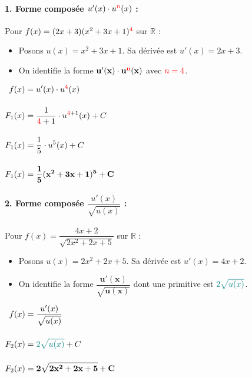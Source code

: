 \documentclass[12pt,a4paper]{article}
\begin{document}
\begin{tcolorbox}[colback=gray!5!white,colframe=myblue,title=\textbf{Correction détaillée}]

\paragraph{1. Forme composée $u'(x) \cdot u^{\color{red}n}(x)$ :}
Pour $f(x) = (2x + 3)(x^2 + 3x + 1)^{\color{red}4}$ sur $\mathbb{R}$ :
\begin{itemize}
    \item Posons $u(x) = x^2 + 3x + 1$. Sa dérivée est $u'(x) = 2x + 3$.
    \item On identifie la forme $\mathbf{u'(x) \cdot u^{\color{red}n}(x)}$ avec ${\color{red}n = 4}$.
\end{itemize}

$
\begin{aligned}
f(x) &= u'(x) \cdot u^{\color{red}4}(x)\\[4mm]
F_1(x) &= \dfrac{1}{{\color{red}4} + 1} \cdot u^{{\color{red}4} + 1}(x) + C\\[4mm]
F_1(x) &= \frac{1}{5} \cdot u^5(x) + C\\[4mm]
F_1(x) &= \mathbf{\frac{1}{5}(x^2 + 3x + 1)^5 + C}
\end{aligned}
$

\vspace{0.4cm}

\paragraph{2. Forme composée $\dfrac{u'(x)}{\sqrt{u(x)}}$ :}
Pour $f(x) = \dfrac{4x + 2}{\sqrt{2x^2 + 2x + 5}}$ sur $\mathbb{R}$ :
\begin{itemize}
    \item Posons $u(x) = 2x^2 + 2x + 5$. Sa dérivée est $u'(x) = 4x + 2$.
    \item On identifie la forme $\mathbf{\dfrac{u'(x)}{\sqrt{u(x)}}}$ dont une primitive est ${\color{teal}2\sqrt{u(x)}}$.
\end{itemize}

$
\begin{aligned}
f(x) &= \frac{u'(x)}{\sqrt{u(x)}}\\[4mm]
F_2(x) &= {\color{teal}2\sqrt{u(x)}} + C\\[4mm]
F_2(x) &= \mathbf{2\sqrt{2x^2 + 2x + 5} + C}
\end{aligned}
$


\end{tcolorbox}
\end{document}
